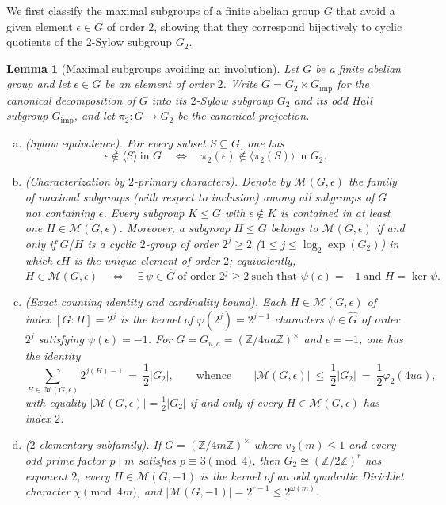\documentclass[11pt, a4paper]{article}
\theoremstyle{plain}
\newtheorem{lemma}[theorem]{Lemma}
\theoremstyle{definition}
\newcommand{\Z}{\mathbb{Z}}
\begin{document}
We first classify the maximal subgroups of a finite abelian group $G$ that avoid a given element $\epsilon\in G$ of order $2$, showing that they correspond bijectively to cyclic quotients of the $2$-Sylow subgroup $G_2$.

\begin{lemma}[Maximal subgroups avoiding an involution]\label{lem:sylow_maximal_subgroups}
Let $G$ be a finite abelian group and let $\epsilon\in G$ be an element of order $2$. Write $G=G_2\times G_{\mathrm{imp}}$ for the canonical decomposition of $G$ into its $2$-Sylow subgroup $G_2$ and its odd Hall subgroup $G_{\mathrm{imp}}$, and let $\pi_2:G\to G_2$ be the canonical projection.
\begin{enumerate}[(a)]
    \item \emph{(Sylow equivalence).} For every subset $S\subseteq G$, one has
    $$\epsilon\notin\langle S\rangle\ \text{in }G\quad\Longleftrightarrow\quad\pi_2(\epsilon)\notin\langle\pi_2(S)\rangle\ \text{in }G_2.$$
    \item \emph{(Characterization by $2$-primary characters).} Denote by $\mathcal{M}(G,\epsilon)$ the family of maximal subgroups (with respect to inclusion) among all subgroups of $G$ not containing $\epsilon$. Every subgroup $K\le G$ with $\epsilon\notin K$ is contained in at least one $H\in\mathcal{M}(G,\epsilon)$. Moreover, a subgroup $H\le G$ belongs to $\mathcal{M}(G,\epsilon)$ if and only if $G/H$ is a cyclic $2$-group of order $2^{j}\ge2$ ($1\le j\le\log_2\exp(G_2)$) in which $\epsilon H$ is the unique element of order $2$; equivalently,
    \begin{equation}\label{eq:maximal_subgroup_char}
    H\in\mathcal{M}(G,\epsilon)\quad\Longleftrightarrow\quad\exists\,\psi\in\widehat{G}\ \text{of order }2^{j}\ge2\ \text{such that }\psi(\epsilon)=-1\ \text{and }H=\ker\psi.
    \end{equation}
    \item \emph{(Exact counting identity and cardinality bound).} Each $H\in\mathcal{M}(G,\epsilon)$ of index $[G:H]=2^{j}$ is the kernel of $\varphi(2^{j})=2^{j-1}$ characters $\psi\in\widehat{G}$ of order $2^{j}$ satisfying $\psi(\epsilon)=-1$. For $G=G_{u,a}=(\Z/4ua\Z)^{\times}$ and $\epsilon=-1$, one has the identity
    \begin{equation}\label{eq:exact_kernel_count}
    \sum_{H\in\mathcal{M}(G,\epsilon)}2^{j(H)-1}\ =\ \frac12|G_2|,\qquad\text{whence}\qquad\big|\mathcal{M}(G,\epsilon)\big|\ \le\ \frac12|G_2|\ =\ \frac12\varphi_2(4ua),
    \end{equation}
    with equality $|\mathcal{M}(G,\epsilon)|=\frac12|G_2|$ if and only if every $H\in\mathcal{M}(G,\epsilon)$ has index $2$.
    \item \emph{($2$-elementary subfamily).} If $G=(\Z/4m\Z)^{\times}$ where $v_2(m)\le1$ and every odd prime factor $p\mid m$ satisfies $p\equiv3\pmod 4$, then $G_2\cong(\Z/2\Z)^{r}$ has exponent $2$, every $H\in\mathcal{M}(G,-1)$ is the kernel of an odd quadratic Dirichlet character $\chi\pmod{4m}$, and $|\mathcal{M}(G,-1)|=2^{r-1}\le 2^{\omega(m)}$.
\end{enumerate}
\end{lemma}
\end{document}
